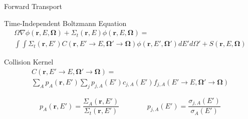 \documentclass{beamer}
\begin{document}
\begin{frame}{Forward Transport}
\begin{block}{Time-Independent Boltzmann Equation}
\begin{multline}
  \Omega \nabla \phi(\boldsymbol r,E,\boldsymbol\Omega) + 
  \Sigma_t(\boldsymbol{r},E)\phi(\boldsymbol{r},E,\boldsymbol{\Omega}) = \\
  \int\int\Sigma_t(\boldsymbol{r},E')C(\boldsymbol{r},E'\rightarrow E,\boldsymbol{\Omega'}\rightarrow\boldsymbol{\Omega})\phi(\boldsymbol{r},E',\boldsymbol{\Omega'})dE'd\Omega' + 
  S(\boldsymbol{r},E,\boldsymbol{\Omega})
\end{multline}
\end{block}

\begin{block}{Collision Kernel}
\begin{multline}
C(\boldsymbol{r},E'\rightarrow E,\boldsymbol{\Omega'}\rightarrow\boldsymbol{\Omega}) = \\
\sum_A p_A(\boldsymbol{r},E') \sum_j p_{j,A}(E') c_{j,A}(E') f_{j,A}(E'\rightarrow E,\boldsymbol{\Omega'}\rightarrow\boldsymbol{\Omega})
\end{multline}

\begin{equation}
p_A(\boldsymbol{r},E') = \frac{\Sigma_A(\boldsymbol{r},E')}{\Sigma_t(\boldsymbol{r},E')}
~~~~~~~~~~~~~~~~~~
p_{j,A}(E') = \frac{\sigma_{j,A}(E')}{\sigma_A(E')} \nonumber
\end{equation}

\end{block}

\end{frame}
\end{document}
